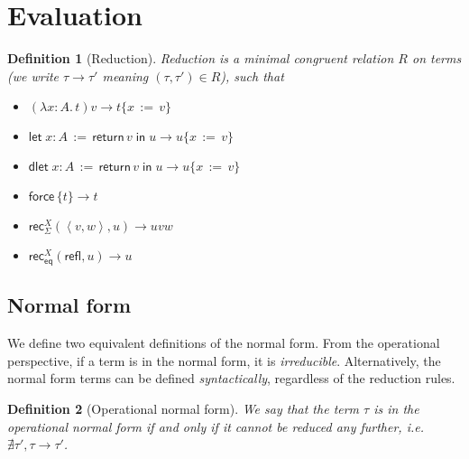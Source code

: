 \documentclass[a4,natbib=false]{article}
\newtheorem{definition}{Definition}
\newcommand{\fun}[2]{\lambda {#1}.\,{#2}}
\newcommand{\letval}[3]{\mathsf{let}\; {#1} \,:=\, {#2} \;\mathsf{in}\; {#3}}
\newcommand{\dletval}[3]{\mathsf{dlet}\; {#1} \,:=\, {#2} \;\mathsf{in}\; {#3}}
\newcommand{\pair}[2]{\left\langle{#1}, {#2}\right\rangle}
\newcommand{\refl}{\mathsf{refl}}
\newcommand{\force}[1]{\mathsf{force}\,{#1}}
\newcommand{\return}[1]{\mathsf{return}\,{#1}}
\newcommand{\thunk}[1]{\{{#1}\}}
\newcommand{\recsigma}[3]{\mathsf{rec}_{\Sigma}^{#2}({#1},{#3})}
\newcommand{\receq}[3]{\mathsf{rec}_{\mathsf{eq}}^{#2}({#1},{#3})}
\newcommand{\subst}[3]{{#1}\{{#2}\,:=\,{#3}\}}
\newcommand{\reduces}[2]{{#1} \rightarrow {#2}}
\begin{document}
\section{Evaluation}
\label{sec:equality}

\begin{definition}[Reduction]
Reduction is a minimal congruent
relation $R$ on terms (we write $\reduces{\tau}{\tau'}$ meaning $(\tau,\tau') \in R$), such that

\begin{multicols}{2}
\begin{itemize}
  \item $\reduces{(\fun{x:A}{t})v}{\subst{t}{x}{v}}$

  \item $\reduces{\letval{x:A}{\return{v}}{u}}{\subst{u}{x}{v}}$

  \item $\reduces{\dletval{x:A}{\return{v}}{u}}{\subst{u}{x}{v}}$

  \item $\reduces{\force{\thunk{t}}}{t}$

  \item $\reduces{\recsigma{\pair{v}{w}}{X}{u}}{u v w}$

  \item $\reduces{\receq{\refl}{X}{u}}{u}$

\end{itemize}
\end{multicols}
\end{definition}


\subsection{Normal form}

We define two equivalent definitions of the normal form. From the operational
perspective, if a term is in the normal form, it is \emph{irreducible}. Alternatively,
the normal form terms can be defined \emph{syntactically}, regardless of the reduction rules.

\begin{definition}[Operational normal form]
  We say that the term $\tau$ is in the operational
  normal form if and only if it cannot be reduced any further, i.e.
  $\nexists \tau', \reduces{\tau}{\tau'}$.
\end{definition}
\end{document}
